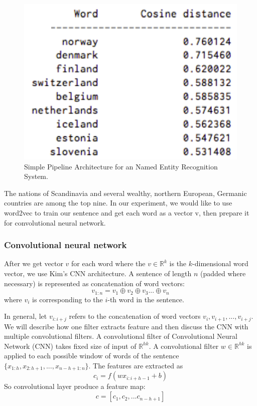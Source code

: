 \documentclass[10pt,twocolumn,letterpaper]{article}
\begin{document}
\begin{figure}
\includegraphics[width=\linewidth]{word2vec}
\caption{Simple Pipeline Architecture for an Named Entity Recognition System. }
\label{fig:word2vec}
\end{figure}
The nations of Scandinavia and several wealthy, northern European, Germanic countries are among the top nine. \cite{bahrampour2015comparative}
In our experiment, we would like to use word2vec to train our sentence and get each word as a vector v, then prepare it for convolutional neural network.

\subsubsection{Convolutional neural network}
After we get vector $v$ for each word where the $v \in \mathbb{R}^k$ is the $k$-dimensional word vector, we use Kim's CNN architecture. A sentence of length $n$ (padded where necessary) is represented as concatenation of word vectors:
$$v_{1:n} = v_1 \oplus v_2 \oplus v_3 ... \oplus v_n$$
where $v_i$ is corresponding to the $i$-th word in the sentence. 

In general, let $v_{i:i+j}$ refers to the concatenation of word vectors $v_i, v_{i+1}, ..., v_{i+j}$. We will describe how one filter extracts feature and then discuss the CNN with multiple convolutional filters. A convolutional filter of Convolutional Neural Network (CNN)  \cite{kim2014convolutional} takes fixed size of input of $\mathbb{R}^{hk}$. A convolutional filter $w \in \mathbb{R}^{hk}$ is applied to each possible window of words of the sentence $\{x_{1:h}, x_{2:h+1}, ..., x_{n-h+1:n}\}$. The features are extracted as
$$c_i = f(w  x_{i:i+h-1} + b)$$
So convolutional layer produce a feature map:
$$c = [c_1, c_2, ... c_{n-h+1}]$$
 
\end{document}
